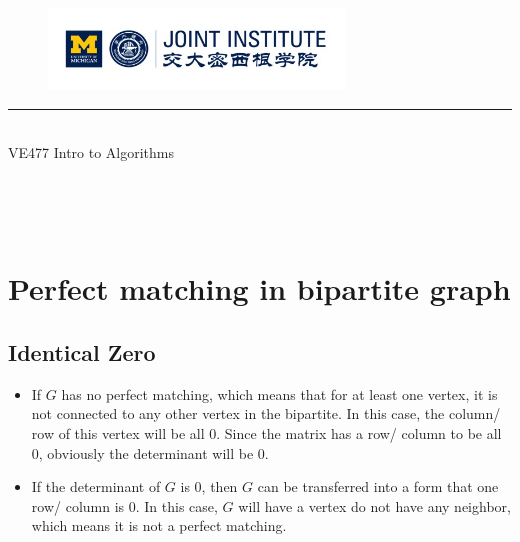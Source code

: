\documentclass{article}
\begin{document}
\setmainfont{Cormorant Upright}
\renewcommand\arraystretch{1.5}


\thispagestyle{empty}

\begin{center}
\begin{large}
\begin{figure}[!htbp]
\centering
\includegraphics[width=0.7\textwidth]{Logo2}
\end{figure}
\hrule
\vspace*{0.25cm}
 \\
\Large  VE477 Intro to Algorithms\\
\end{large}
\hrulefill

\vspace*{3cm}

\begin{Large}
 \\
\end{Large}
\vspace*{2cm}
\begin{large}
 \\
\end{large}
\end{center}
\newpage
\setmainfont{Optima}
\setmonofont{Optima}
\setsansfont{Optima}
\setcounter{page}{1}
\section{Perfect matching in bipartite graph}
\subsection{Identical Zero}
\begin{itemize}
\item If $G$ has no perfect matching, which means that for at least one vertex, it is not connected to any other vertex in the bipartite. In this case, the column/ row of this vertex will be all 0. Since the matrix has a row/ column to be all 0, obviously the determinant will be 0.
\item If the determinant of $G$ is 0, then $G$ can be transferred into a form that one row/ column is 0. In this case, $G$ will have a vertex do not have any neighbor, which means it is not a perfect matching.
\end{itemize}
\end{document}
